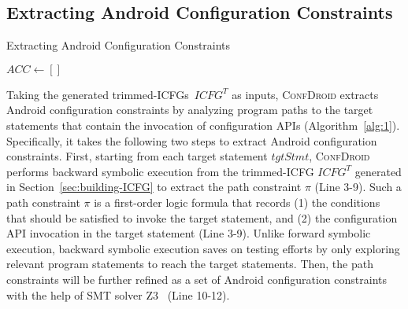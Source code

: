 \subsection{Extracting Android Configuration Constraints}
\label{sec:extract-configuration-constraint}
\begin{algorithm}[t]
	\caption{Extracting Android Configuration Constraints}
	\DontPrintSemicolon
	\label{alg:1}

	$ACC \leftarrow []$\;
	\;
\end{algorithm}

Taking the generated trimmed-ICFGs~$ICFG^T$ as inputs,
\textsc{ConfDroid} extracts Android configuration constraints by analyzing
program paths to the target statements that contain the invocation of
configuration APIs (Algorithm~\ref{alg:1}).
Specifically, it takes the following two steps to extract Android
configuration constraints.
First, starting from each target statement $tgtStmt$, \textsc{ConfDroid} performs backward symbolic execution from the trimmed-ICFG $ICFG^T$ generated in Section~\ref{sec:building-ICFG} to extract the path constraint $\pi$ (Line 3-9).
Such a path constraint $\pi$ is a first-order logic formula that records (1) the conditions that should be satisfied to invoke the target statement, and (2) the configuration API invocation in the target statement (Line 3-9).
Unlike forward symbolic execution, backward symbolic execution saves on testing efforts by only exploring relevant program statements to reach the target statements.
Then, the path constraints will be further refined as a set of Android configuration constraints with the help of SMT solver Z3~\cite{z3} (Line 10-12).


